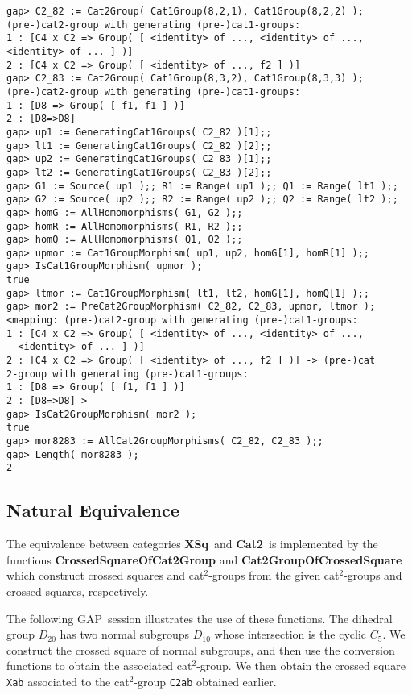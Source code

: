 \documentclass{ws-ijac}
\newcommand{\GAP}      {{\sf GAP}}
\newcommand{\catCatt}   {{\bf Cat2}}
\newcommand{\catXSq}    {{\bf XSq}}
\begin{document}
\small{
\begin{verbatim}
gap> C2_82 := Cat2Group( Cat1Group(8,2,1), Cat1Group(8,2,2) ); 
(pre-)cat2-group with generating (pre-)cat1-groups:
1 : [C4 x C2 => Group( [ <identity> of ..., <identity> of ...,
<identity> of ... ] )]
2 : [C4 x C2 => Group( [ <identity> of ..., f2 ] )]
gap> C2_83 := Cat2Group( Cat1Group(8,3,2), Cat1Group(8,3,3) ); 
(pre-)cat2-group with generating (pre-)cat1-groups:
1 : [D8 => Group( [ f1, f1 ] )]
2 : [D8=>D8]
gap> up1 := GeneratingCat1Groups( C2_82 )[1];;
gap> lt1 := GeneratingCat1Groups( C2_82 )[2];;
gap> up2 := GeneratingCat1Groups( C2_83 )[1];;
gap> lt2 := GeneratingCat1Groups( C2_83 )[2];;
gap> G1 := Source( up1 );; R1 := Range( up1 );; Q1 := Range( lt1 );;
gap> G2 := Source( up2 );; R2 := Range( up2 );; Q2 := Range( lt2 );;
gap> homG := AllHomomorphisms( G1, G2 );;
gap> homR := AllHomomorphisms( R1, R2 );;
gap> homQ := AllHomomorphisms( Q1, Q2 );;
gap> upmor := Cat1GroupMorphism( up1, up2, homG[1], homR[1] );;
gap> IsCat1GroupMorphism( upmor ); 
true
gap> ltmor := Cat1GroupMorphism( lt1, lt2, homG[1], homQ[1] );;
gap> mor2 := PreCat2GroupMorphism( C2_82, C2_83, upmor, ltmor ); 
<mapping: (pre-)cat2-group with generating (pre-)cat1-groups:
1 : [C4 x C2 => Group( [ <identity> of ..., <identity> of ..., 
  <identity> of ... ] )]
2 : [C4 x C2 => Group( [ <identity> of ..., f2 ] )] -> (pre-)cat
2-group with generating (pre-)cat1-groups:
1 : [D8 => Group( [ f1, f1 ] )]
2 : [D8=>D8] >
gap> IsCat2GroupMorphism( mor2 ); 
true
gap> mor8283 := AllCat2GroupMorphisms( C2_82, C2_83 );;
gap> Length( mor8283 );
2
\end{verbatim}
}

\subsection{Natural Equivalence}

The equivalence between categories \catXSq\ and \catCatt\ 
is implemented by the functions 
\textbf{CrossedSquareOfCat2Group} and \textbf{Cat2GroupOfCrossedSquare} 
which construct crossed squares and cat$^{2}$-groups 
from the given cat$^{2}$-groups and crossed squares, respectively.

The following \GAP\ session illustrates the use of these functions.
The dihedral group $D_{20}$ has two normal subgroups $D_{10}$ 
whose intersection is the cyclic $C_5$.  
We construct the crossed square of normal subgroups, 
and then use the conversion functions to obtain the associated cat$^{2}$-group. 
We then obtain the crossed square \texttt{Xab} 
associated to the cat$^2$-group \texttt{C2ab} obtained earlier. 
\end{document}
